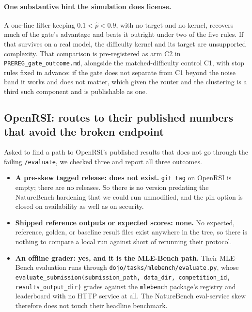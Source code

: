 \paragraph{One substantive hint the simulation does license.} A one-line filter keeping
$0.1<\hat p<0.9$, with no target and no kernel, recovers much of the gate's advantage and
beats it outright under two of the five rules. If that survives on a real model, the
difficulty kernel and its target are unsupported complexity. That comparison is
pre-registered as arm C2 in \texttt{PREREG\_gate\_outcome.md}, alongside the matched-difficulty
control C1, with stop rules fixed in advance: if the gate does not separate from C1 beyond
the noise band it works and does not matter, which given the router and the clustering is a
third such component and is publishable as one.

\subsection{OpenRSI: routes to their published numbers that avoid the broken endpoint}
\label{sec:openrsiroutes}

Asked to find a path to OpenRSI's published results that does not go through the failing
\texttt{/evaluate}, we checked three and report all three outcomes.

\begin{itemize}
\item \textbf{A pre-skew tagged release: does not exist.} \texttt{git tag} on OpenRSI is
empty; there are no releases. So there is no version predating the NatureBench hardening
that we could run unmodified, and the pin option is closed on availability as well as on
security.
\item \textbf{Shipped reference outputs or expected scores: none.} No expected, reference,
golden, or baseline result files exist anywhere in the tree, so there is nothing to compare
a local run against short of rerunning their protocol.
\item \textbf{An offline grader: yes, and it is the MLE-Bench path.} Their MLE-Bench
evaluation runs through \texttt{dojo/tasks/mlebench/evaluate.py}, whose
\texttt{evaluate\_submission(submission\_path, data\_dir, competition\_id, results\_output\_dir)}
grades against the \texttt{mlebench} package's registry and leaderboard with no HTTP service
at all. The NatureBench eval-service skew therefore does not touch their headline benchmark.
\end{itemize}

